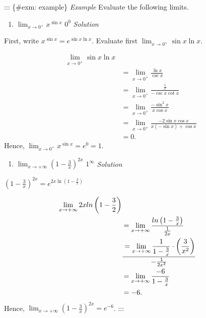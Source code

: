 \documentclass[
  letterpaper,
  DIV=11,
  numbers=noendperiod]{scrartcl}
\providecommand{\tightlist}{%
  \setlength{\itemsep}{0pt}\setlength{\parskip}{0pt}}\usepackage{longtable,booktabs,array}
\theoremstyle{definition}
\theoremstyle{plain}
\theoremstyle{remark}
\begin{document}
::: \{\#exm: example\} \emph{Example} Evaluate the following limits.

\begin{enumerate}
\def\labelenumi{\arabic{enumi}.}
\tightlist
\item
  \(\displaystyle\lim_{x\to 0^+}{x^{\sin x}}\) \(0^0\) \emph{Solution}
\end{enumerate}

First, write \(x^{\sin x}=e^{\sin x \ln x}\). Evaluate first
\(\displaystyle\lim_{x\to 0^+}{\sin x \ln x}\).

\[
\begin{aligned}
\displaystyle\lim_{x\to 0^+}{\sin x \ln x}\\&=\displaystyle\lim_{x\to 0^+}{\frac{\ln x}{\csc x}}\\&=\displaystyle\lim_{x\to 0^+}{\frac{\frac{1}{x}}{-\csc x \cot x}}\\&=\displaystyle\lim_{x\to 0^+}{\frac{-\sin^2 x}{x \cos x}}\\&=\displaystyle\lim_{x\to 0^+}{\frac{-2\sin x \cos x}{x(-\sin x)+\cos x}}\\&=0.
\end{aligned}
\] Hence, \(\displaystyle\lim_{x\to 0^+}{x^{\sin x}}=e^0=1\).

\begin{enumerate}
\def\labelenumi{\arabic{enumi}.}
\setcounter{enumi}{1}
\tightlist
\item
  \(\displaystyle\lim_{x\to +\infty}{\left(1-\frac{3}{x}\right)^{2x}}\)
  \(1^\infty\) \emph{Solution}
\end{enumerate}

\(\left(1-\frac{3}{x}\right)^{2x}=e^{2x\ln \left(1-\frac{3}{x}\right)}\)

\[
\begin{aligned}
\displaystyle\lim_{x\to +\infty}{2x ln \left(1-\frac{3}{2}\right)}\\&=\displaystyle\lim_{x\to +\infty}{\frac{ln \left(1-\frac{3}{x}\right)}{\frac{1}{2x}}}\\&=\displaystyle\lim_{x\to +\infty}{\frac{1}{1-\frac{3}{x}}}\cdot \left(\frac{3}{x^2}\right)\over-\frac{1}{2x^2}\\&=\displaystyle\lim_{x\to +\infty}{\frac{-6}{1-\frac{3}{x}}}\\&=-6.
\end{aligned}
\] Hence,
\(\displaystyle\lim_{x\to +\infty}{\left(1-\frac{3}{x}\right)^{2x}}=e^{-6}\).
:::
\end{document}
